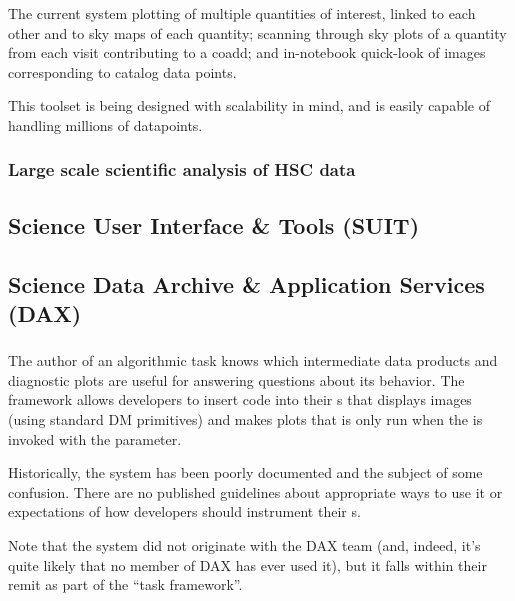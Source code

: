 \documentclass[DM,authoryear,toc,lsstdraft]{lsstdoc}
\begin{document}
The current system plotting of multiple quantities of interest, linked to each
other and to sky maps of each quantity; scanning through sky plots of a
quantity from each visit contributing to a coadd; and in-notebook quick-look
of images corresponding to catalog data points.

This toolset is being designed with scalability in mind, and is easily capable
of handling millions of datapoints.

\subsubsection{Large scale scientific analysis of HSC data}
\label{sec:current:drp:hsc}

\subsection{Science User Interface \& Tools (SUIT)}
\label{sec:current:suit}

\subsection{Science Data Archive \& Application Services (DAX)}
\label{sec:current:dax}

\subsubsection{}
\label{sec:current:dax:debugopt}

The author of an algorithmic task knows which intermediate data products and
diagnostic plots are useful for answering questions about its behavior. The
 framework allows developers to insert code into their
s that displays images (using standard DM primitives) and makes
plots that is only run when the  is invoked with the
 parameter.

Historically, the  system has been poorly documented and the
subject of some confusion. There are no published guidelines about appropriate
ways to use it or expectations of how developers should instrument their
s.

Note that the  system did not originate with the DAX team
(and, indeed, it's quite likely that no member of DAX has ever used it), but
it falls within their remit as part of the ``task framework''.
\end{document}
